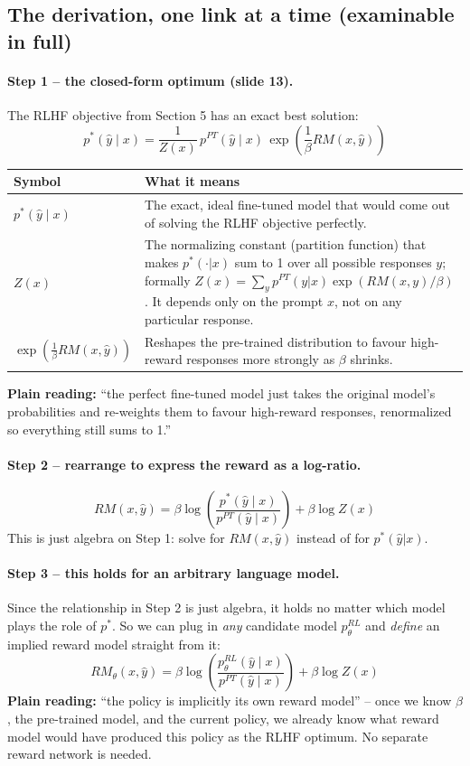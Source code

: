 \documentclass[11pt]{article}
\begin{document}
\subsection{The derivation, one link at a time (examinable in full)}

\paragraph{Step 1 -- the closed-form optimum (slide 13).}
The RLHF objective from Section 5 has an exact best solution:
\[
p^*(\hat y \mid x) = \frac{1}{Z(x)}\, p^{PT}(\hat y \mid x)\, \exp\!\left(\frac{1}{\beta}
RM(x,\hat y)\right)
\]

\begin{center}
\begin{longtable}{|>{\raggedright\arraybackslash}p{3.2cm}|>{\raggedright\arraybackslash}p{10.3cm}|}
\hline
\textbf{Symbol} & \textbf{What it means} \\
\hline
$p^*(\hat y \mid x)$ & The exact, ideal fine-tuned model that would come out of
solving the RLHF objective perfectly. \\
\hline
$Z(x)$ & The normalizing constant (partition function) that makes $p^*(\cdot|x)$
sum to 1 over all possible responses $y$; formally
$Z(x) = \sum_y p^{PT}(y|x)\exp(RM(x,y)/\beta)$. It depends only on the prompt
$x$, not on any particular response. \\
\hline
$\exp\!\left(\frac{1}{\beta}RM(x,\hat y)\right)$ & Reshapes the pre-trained
distribution to favour high-reward responses more strongly as $\beta$ shrinks. \\
\hline
\end{longtable}
\end{center}
\textbf{Plain reading:} ``the perfect fine-tuned model just takes the original
model's probabilities and re-weights them to favour high-reward responses,
renormalized so everything still sums to 1.''

\paragraph{Step 2 -- rearrange to express the reward as a log-ratio.}
\[
RM(x,\hat y) = \beta \log\left(\frac{p^*(\hat y \mid x)}{p^{PT}(\hat y \mid
x)}\right) + \beta \log Z(x)
\]
This is just algebra on Step 1: solve for $RM(x,\hat y)$ instead of for
$p^*(\hat y|x)$.

\paragraph{Step 3 -- this holds for an arbitrary language model.}
Since the relationship in Step 2 is just algebra, it holds no matter which model
plays the role of $p^*$. So we can plug in \emph{any} candidate model
$p^{RL}_\theta$ and \emph{define} an implied reward model straight from it:
\[
RM_\theta(x,\hat y) = \beta \log\left(\frac{p^{RL}_\theta(\hat y \mid
x)}{p^{PT}(\hat y \mid x)}\right) + \beta \log Z(x)
\]
\textbf{Plain reading:} ``the policy is implicitly its own reward model'' -- once
we know $\beta$, the pre-trained model, and the current policy, we already know
what reward model would have produced this policy as the RLHF optimum. No
separate reward network is needed.
\end{document}
